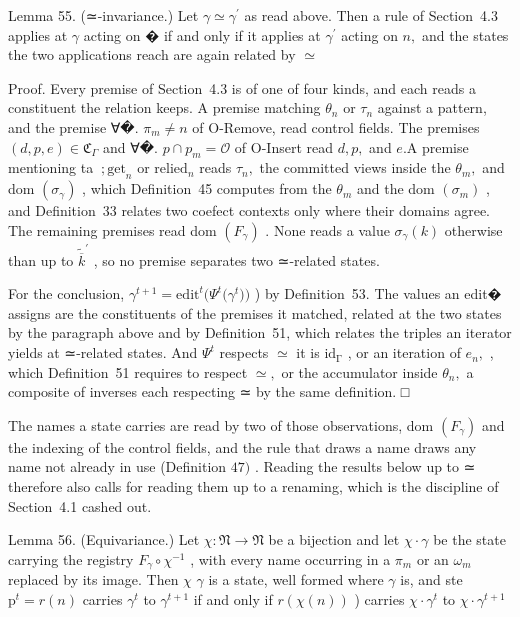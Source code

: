 \documentclass[
  10
]{article}
\begin{document}
Lemma 55. (≃-invariance.) Let \(\gamma \simeq \gamma ^ { \prime }\) as
read above. Then a rule of Section~4.3 applies at \(\gamma\) acting on �
if and only if it applies at \(\gamma ^ { \prime }\) acting on \(n ,\)
and the states the two applications reach are again related by
\(\simeq\)

Proof. Every premise of Section~4.3 is of one of four kinds, and each
reads a constituent the relation keeps. A premise matching
\(\theta _ { n }\) or \(\tau _ { n }\) against a pattern, and the
premise ∀�. \(\pi _ { m } \neq n\) of O-Remove, read control fields. The
premises \(( d , p , e ) \in \mathfrak { C } _ { \Gamma }\) and ∀�.
\(p \cap p _ { m } = \mathcal { O }\) of O-Insert read \(d , p ,\) and
\(e . \mathrm { A }\) premise mentioning ta
\(\mathrm { \ ; g e t } _ { n }\) or \(\mathrm { r e l i e d } _ { n }\)
reads \(\tau _ { n } ,\) the committed views inside the
\(\theta _ { m } ,\) and dom \(\left( \sigma _ { \gamma } \right)\) ,
which Definition~45 computes from the \(\theta _ { m }\) and the dom
\(( \sigma _ { m } )\) , and Definition~33 relates two coefect contexts
only where their domains agree. The remaining premises read dom
\(\left( F _ { \gamma } \right)\) . None reads a value
\(\sigma _ { \gamma } ( k )\) otherwise than up to
\({ \widetilde { \overline { { k } } } } ^ { \prime }\) , so no premise
separates two ≃-related states.

For the conclusion,
\(\gamma ^ { t + 1 } = \mathrm { e d i t } ^ { t } \big ( \Psi ^ { t } \big ( \gamma ^ { t } \big ) \big )\)
) by Definition~53. The values an edit� assigns are the constituents of
the premises it matched, related at the two states by the paragraph
above and by Definition~51, which relates the triples an iterator yields
at ≃-related states. And \(\Psi ^ { t }\) respects \(\simeq\) it is
\(\mathrm { i d _ { \Gamma } }\) , or an iteration of \(e _ { n } ,\) ,
which Definition~51 requires to respect \(\simeq ,\) or the accumulator
inside \(\theta _ { n } ,\) a composite of inverses each respecting ≃ by
the same definition. □

The names a state carries are read by two of those observations, dom
\(\left( F _ { \gamma } \right)\) and the indexing of the control
fields, and the rule that draws a name draws any name not already in use
(Definition \(4 7 )\) . Reading the results below up to ≃ therefore also
calls for reading them up to a renaming, which is the discipline of
Section~4.1 cashed out.

Lemma 56. (Equivariance.) Let
\(\chi : \mathfrak { N } \to \mathfrak { N }\) be a bijection and let
\(\chi \cdot \gamma\) be the state carrying the registry
\(F _ { \gamma } \circ \chi ^ { - 1 }\) , with every name occurring in a
\(\pi _ { m }\) or an \(\omega _ { m }\) replaced by its image. Then
\(\chi\) \(\gamma\) is a state, well formed where \(\gamma\) is, and ste
\(\mathrm { p } ^ { t } = r ( n )\) carries \(\gamma ^ { t }\) to
\(\gamma ^ { t + 1 }\) if and only if \(r ( \chi ( n ) )\) ) carries
\(\chi \cdot \gamma ^ { t }\) to \(\chi \cdot \gamma ^ { t + 1 }\)
\end{document}
